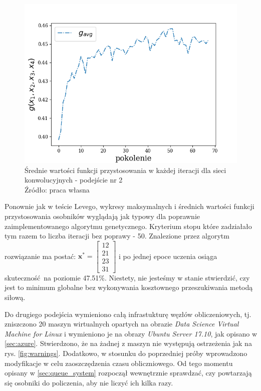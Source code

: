 \begin{figure}[h!tb]
	 \centering
	 \includegraphics[width = 0.9\linewidth]{img/cnn_means}
	 \caption{Średnie wartości funkcji przystosowania w każdej iteracji dla sieci konwolucyjnych - podejście nr 2\\
              Źródło: praca własna}
	 \label{fig:cnn_means}
\end{figure}

Ponownie jak w teście Levego, wykresy maksymalnych i średnich wartości funkcji przystosowania osobników wyglądają jak typowy dla poprawnie zaimplementowanego algorytmu genetycznego.
Kryterium stopu które zadziałało tym razem to liczba iteracji bez poprawy - 50.
Znalezione przez algorytm rozwiązanie ma postać: $\mathbf{x^*} = \begin{bmatrix}12 \\ 21 \\ 23 \\ 31\end{bmatrix}$ i po jednej epoce uczenia osiąga skuteczność na poziomie 47.51\%.
Niestety, nie jesteśmy w stanie stwierdzić, czy jest to minimum globalne bez wykonywania kosztownego przeszukiwania metodą siłową.

Do drugiego podejścia wymieniono całą infrastukturę węzłów obliczeniowych, tj. zniszczono 20 maszyn wirtualnych opartych na obrazie \textit{Data Science Virtual Machine for Linux} i wymieniono je na obrazy \textit{Ubuntu Server 17.10}, jak opisano w \ref{sec:azure}.
Stwierdzono, że na żadnej z maszyn nie występują ostrzeżenia jak na rys. \ref{fig:warnings}.
Dodatkowo, w stosunku do poprzedniej próby wprowadzono modyfikacje w celu zaoszczędzenia czasu obliczniowego.
Od tego momentu opisany w \ref{sec:queue_system} rozpoczął wewnętrznie sprawdzać, czy powtarzają się osobniki do policzenia, aby nie liczyć ich kilka razy.

